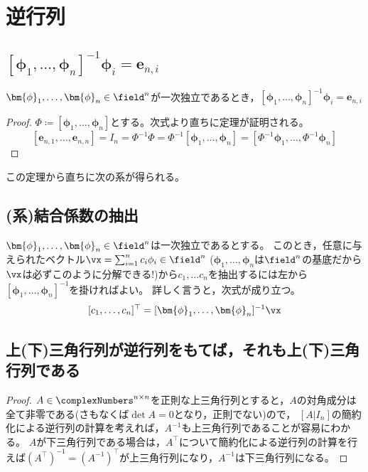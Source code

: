 \chapter{逆行列}
    \section{\texorpdfstring{$[\bm{\phi}_1,\dotsc,\bm{\phi}_n]^{-1}\bm{\phi}_i=\bm{e}_{n,i}$}{[φ1,...,φn]\string^(-1)φi = ei}}
        \label{逆行列にその構成縦ベクトルを掛ける}
        \begin{shadebox}
            $\bm{\phi}_1,\dotsc,\bm{\phi}_n\in\field^n$が一次独立であるとき，$[\bm{\phi}_1,\dotsc,\bm{\phi}_n]^{-1}\bm{\phi}_i=\bm{e}_{n,i}$
        \end{shadebox}
        \begin{proof}
            $\Phi \coloneq [\bm{\phi}_1,\dotsc,\bm{\phi}_n]$とする。次式より直ちに定理が証明される。
            \[[\bm{e}_{n,1},\dotsc,\bm{e}_{n,n}] = I_n = \Phi^{-1}\Phi = \Phi^{-1}[\bm{\phi}_1,\dotsc,\bm{\phi}_n] = [\Phi^{-1}\bm{\phi}_1,\dotsc,\Phi^{-1}\bm{\phi}_n]\]
        \end{proof}
        この定理から直ちに次の系が得られる。
    \section{(系)結合係数の抽出}
        \begin{shadebox}
            $\bm{\phi}_1,\dotsc,\bm{\phi}_n\in\field^n$は一次独立であるとする。
            このとき，任意に与えられたベクトル$\vx = \sum_{i=1}^{n}{c_i\phi_i}\in\field^n$ ($\bm{\phi}_1,\dotsc,\bm{\phi}_n$は$\field^n$の基底だから$\vx$は必ずこのように分解できる!)から$c_1,\dotsc c_n$を抽出するには左から$[\bm{\phi}_1,\dotsc,\bm{\phi}_n]^{-1}$を掛ければよい。
            詳しく言うと，次式が成り立つ。
            \[[c_1,\dots,c_n]^\top = [\bm{\phi}_1,\dotsc,\bm{\phi}_n]^{-1}\vx\]
        \end{shadebox}
    \section{上(下)三角行列が逆行列をもてば，それも上(下)三角行列である}
        \begin{proof}
            $A\in \complexNumbers^{n\times n}$を正則な上三角行列とすると，$A$の対角成分は全て非零である(さもなくば$\det{A}=0$となり，正則でない)ので，
            $[A|I_n]$の簡約化による逆行列の計算を考えれば，$A^{-1}$も上三角行列であることが容易にわかる。
            $A$が下三角行列である場合は，$A^\top$について簡約化による逆行列の計算を行えば$(A^\top)^{-1} = (A^{-1})^\top$が上三角行列になり，$A^{-1}$は下三角行列になる。
        \end{proof}
